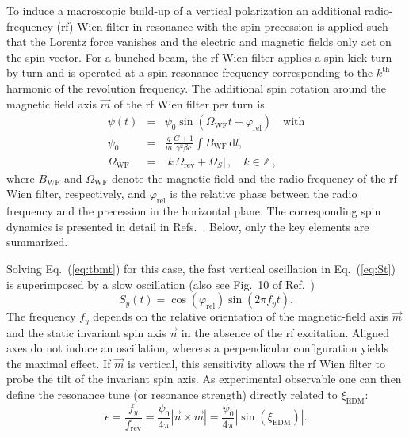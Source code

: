 \documentclass[
    10pt,
    twocolumn,
    secnumarabic,
    amssymb,
    nobibnotes,
    aps,
    prl,

    longbibliography,
    superscriptaddress
    ]{revtex4-2}
\newcommand{\phirel}{\varphi_\mathrm{rel} }
\newcommand{\fc}{f_\mathrm{rev} }
\newcommand{\xiedm}{\xi_{\text{EDM}}}
\begin{document}
To induce a macroscopic build-up of a vertical polarization an additional radio-frequency (rf) Wien filter \cite{Rathmann:2013rqa,PhysRevSTAB.16.114001} in resonance with the spin precession is applied such that the Lorentz force vanishes \cite{Slim:2016pim} and the electric and magnetic fields only act on the spin vector.
For a bunched beam, the rf Wien filter applies a spin kick turn by turn and is operated at a spin-resonance frequency corresponding to the $k^\textrm{th}$ harmonic of the revolution frequency.
The additional spin rotation around the magnetic field axis $\vec{m}$ of the rf Wien filter per turn is
\begin{eqnarray}
    \psi(t) &=& \psi_0 \sin(\Omega_\mathrm{WF} t + \phirel) \quad \mbox{with} \label{eq:wfrot}\\
    \psi_0 &=& \frac{q}{m} \frac{G+1}{\gamma^2\beta c} \int B_\textrm{WF}\,\text{d}l, \\
    \Omega_\mathrm{WF} &=& | k\,\Omega_\mathrm{rev} + \Omega_S | \,,\quad k\in\mathbb{Z}\,,
\end{eqnarray}
where $B_\textrm{WF}$ and $\Omega_\mathrm{WF}$ denote the magnetic field  and the radio frequency of the rf Wien filter, respectively, and $\phirel$ is the relative phase between the radio frequency and the precession in the horizontal plane.
The corresponding spin dynamics is presented in detail in Refs.~\cite{Rathmann:2019lwi,PhysRevAccelBeams.27.111002}. Below, only the key elements are summarized.

Solving Eq.~(\ref{eq:tbmt}) for this case, the fast vertical oscillation in Eq.~(\ref{eq:St}) is superimposed by a slow oscillation (also see Fig.~10 of Ref.~\cite{PhysRevAccelBeams.28.062801})
\begin{equation}\label{eq:oscwf}
S_y(t) = \cos(\phirel)\sin \left( 2\pi f_y t \right) .
\end{equation}
The frequency $f_y$ depends on the relative orientation of the magnetic-field axis $\vec m$ and the static invariant spin axis $\vec n$ in the absence of the rf excitation.
Aligned axes do not induce an oscillation, whereas a perpendicular configuration yields the maximal effect. If $\vec{m}$ is vertical, this sensitivity allows the rf Wien filter to probe the tilt of the invariant spin axis.
As experimental observable one can then define the resonance tune (or resonance strength) directly related to $\xiedm$:
\begin{equation}
    \epsilon = \frac{f_y}{\fc} = \frac{\psi_0}{4\pi}|\vec{n}\times\vec{m}| = \frac{\psi_0}{4\pi}|\sin(\xiedm)|.  \label{eq:resonance_strength}
\end{equation}
\end{document}
